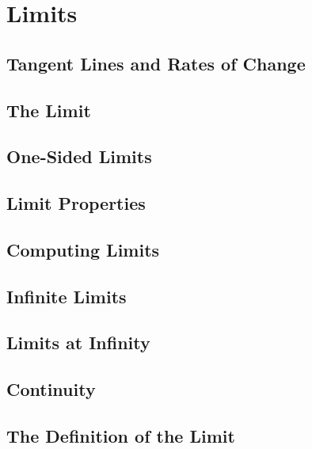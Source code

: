 \documentclass[../satmath.tex]{subfiles}
\begin{document}
\chapter{Limits}
\section{Tangent Lines and Rates of Change}
\section{The Limit}
\section{One-Sided Limits}
\section{Limit Properties}
\section{Computing Limits}
\section{Infinite Limits}
\section{Limits at Infinity}
\section{Continuity}
\section{The Definition of the Limit}
\end{document}
